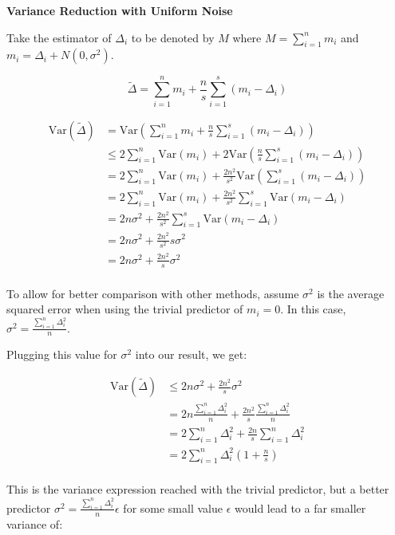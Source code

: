 \documentclass[11pt]{article}
\newcommand{\subsubsubsection}[1]{
  \vspace{1em} %
  \noindent\textbf{#1} %
  \vspace{0.5em} %
}
\begin{document}
\subsubsubsection{Variance Reduction with Uniform Noise}

Take the estimator of $\Delta_i$ to be denoted by $M$ where $M = \sum_{i = 1}^{n} m_i$ and $m_i = \Delta_i + N(0, \sigma^2)$.

\[
\tilde{\Delta} = \sum_{i = 1}^{n} m_i + \frac{n}{s} \sum_{i = 1}^{s} (m_i - \Delta_i)
\]

\[
\begin{aligned}
\mathrm{Var}(\tilde{\Delta}) &= \mathrm{Var}( \sum_{i = 1}^{n} m_i + \frac{n}{s} \sum_{i = 1}^{s} (m_i - \Delta_i)) \\
&\leq 2\sum_{i = 1}^{n} \mathrm{Var}(m_i) + 2\mathrm{Var}(\frac{n}{s} \sum_{i = 1}^{s} (m_i - \Delta_i)) \\
&= 2\sum_{i = 1}^{n} \mathrm{Var}(m_i) + \frac{2n^2}{s^2} \mathrm{Var}(\sum_{i = 1}^{s} (m_i - \Delta_i)) \\
&= 2\sum_{i = 1}^{n} \mathrm{Var}(m_i) + \frac{2n^2}{s^2} \sum_{i = 1}^{s} \mathrm{Var}(m_i - \Delta_i) \\
&= 2n \sigma^2 + \frac{2n^2}{s^2} \sum_{i = 1}^{s} \mathrm{Var}(m_i - \Delta_i) \\
&= 2n \sigma^2 + \frac{2n^2}{s^2} s \sigma^2 \\
&= 2n \sigma^2 + \frac{2n^2}{s} \sigma^2 \\
\end{aligned}
\]

To allow for better comparison with other methods, assume $\sigma^2$ is the average squared error when using the trivial predictor of $m_i = 0$.
In this case, $\sigma^2 = \frac{\sum_{i = 1}^{n}\Delta_i^2}{n}$.

Plugging this value for $\sigma^2$ into our result, we get:

\[
\begin{aligned}
\mathrm{Var}(\tilde{\Delta}) &\leq 2n \sigma^2 + \frac{2n^2}{s} \sigma^2 \\
&= 2n \frac{\sum_{i = 1}^{n}\Delta_i^2}{n} + \frac{2n^2}{s} \frac{\sum_{i = 1}^{n}\Delta_i^2}{n} \\
&= 2\sum_{i = 1}^{n}\Delta_i^2 + \frac{2n}{s} \sum_{i = 1}^{n}\Delta_i^2 \\
&= 2\sum_{i = 1}^{n}\Delta_i^2(1 + \frac{n}{s}) \\
\end{aligned}
\]

This is the variance expression reached with the trivial predictor, but a better predictor $\sigma^2 = \frac{\sum_{i = 1}^{n}\Delta_i^2}{n} \epsilon$ for some small value $\epsilon$ would lead to a far smaller variance of:
\end{document}
